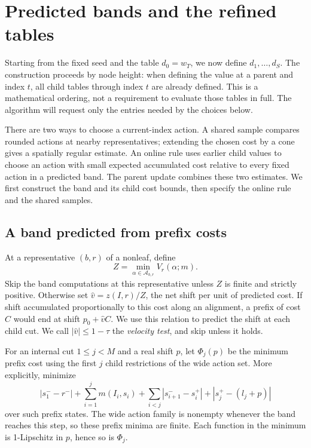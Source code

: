 \section{Predicted bands and the refined tables}\label{sec:bands}

Starting from the fixed seed and the table $d_0=w_T$, we now define
$d_1,\ldots,d_S$. The construction proceeds by node height: when defining
the value at a parent and index $t$, all child tables through index $t$
are already defined. This is a mathematical ordering, not a requirement
to evaluate those tables in full. The algorithm will request only the
entries needed by the choices below.

There are two ways to choose a current-index action. A shared sample
compares rounded actions at nearby representatives; extending the chosen
cost by a cone gives a spatially regular estimate. An online rule uses
earlier child values to choose an action with small expected accumulated cost
relative to every fixed action in a predicted band. The parent update
combines these two estimates. We first construct the band and its child
cost bounds, then specify the online rule and the shared samples.

\subsection{A band predicted from prefix costs}

At a representative $(b,r)$ of a nonleaf, define
\[
 Z=\min_{\alpha\in\mathcal A_{b,r}}V_r(\alpha;m).
\]
Skip the band computations at this representative unless $Z$ is finite
and strictly positive.  Otherwise set $\widehat v=z(I,r)/Z$, the net
shift per unit of predicted cost. If shift accumulated proportionally to
this cost along an alignment, a prefix of cost $C$ would end at shift
$p_0+\widehat v C$. We use this relation to predict the shift at each
child cut. We call $|\widehat v|\le1-\tau$ the
\emph{velocity test}, and skip unless it holds.

For an internal cut $1\le j<M$ and a real shift $p$, let
$\Phi_j(p)$ be the minimum prefix cost using the first $j$ child
restrictions of the wide action set.  More explicitly, minimize
\[
 |s_1^--r^-|+\sum_{i=1}^j m(I_i,s_i)
 +\sum_{i<j}|s_{i+1}^--s_i^+|+|s_j^+-(l_j+p)|
\]
over such prefix states.  The wide action family is nonempty whenever
the band reaches this step, so these prefix minima are finite.  Each
function in the minimum is 1-Lipschitz in $p$, hence so is $\Phi_j$.

